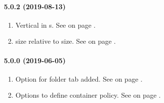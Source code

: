 \paragraph{5.0.2 (2019-08-13)}
\begin{enumerate}
\item Vertical \SEPARATOR{} in \FIELDGROUP s.
      See  on page \pageref{dia:uifieldgroupline}.
\item \VOID{} size relative to \FORM{} size.
      See  on page \pageref{dia:uifieldvoidsize}.
\end{enumerate}
\paragraph{5.0.0 (2019-06-05)}
\begin{enumerate}
\item Option \OMITTTRAIL{} for \MAP{} folder tab added.
      See  on page \pageref{dia:jobmapelement}.
\item Options to define container \SCROLLBARS{} policy.
      See  on page \pageref{dia:uiformcontaineroptions}.
\end{enumerate}
